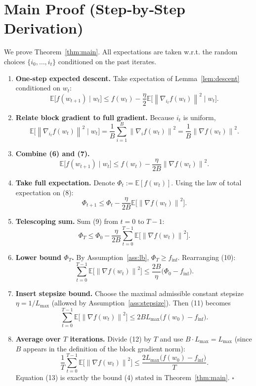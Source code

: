 \documentclass{article}
\newcommand{\E}{\mathbb{E}}
\newcommand{\norm}[1]{\left\|#1\right\|}
\newcommand{\grad}{\nabla}
\begin{document}
\section*{Main Proof (Step‑by‑Step Derivation)}
We prove Theorem~\ref{thm:main}.  All expectations are taken w.r.t. the
random choices $\{i_0,\dots ,i_{t}\}$ conditioned on the past iterates.

\begin{enumerate}[label=[Step \arabic*]]
\item \textbf{One‑step expected descent.}  
Take expectation of Lemma~\ref{lem:descent} conditioned on $w_t$:
\[
\E\!\bigl[f(w_{t+1})\mid w_t\bigr]
\le f(w_t)-\frac{\eta}{2}\E\!\bigl[\norm{\grad_{i_t}f(w_t)}^{2}\mid w_t\bigr].
\tag{6}
\]

\item \textbf{Relate block gradient to full gradient.}  
Because $i_t$ is uniform,
\[
\E\!\bigl[\norm{\grad_{i_t}f(w_t)}^{2}\mid w_t\bigr]
=\frac1B\sum_{i=1}^{B}\norm{\grad_i f(w_t)}^{2}
=\frac1B\norm{\grad f(w_t)}^{2}.
\tag{7}
\]

\item \textbf{Combine (6) and (7).}
\[
\E\!\bigl[f(w_{t+1})\mid w_t\bigr]
\le f(w_t)-\frac{\eta}{2B}\norm{\grad f(w_t)}^{2}.
\tag{8}
\]

\item \textbf{Take full expectation.}  
Denote $\Phi_t:=\E[f(w_t)]$.  Using the law of total expectation on (8):
\[
\Phi_{t+1}\le \Phi_t-\frac{\eta}{2B}\E\!\bigl[\norm{\grad f(w_t)}^{2}\bigr].
\tag{9}
\]

\item \textbf{Telescoping sum.}  
Sum (9) from $t=0$ to $T-1$:
\[
\Phi_T\le \Phi_0-\frac{\eta}{2B}\sum_{t=0}^{T-1}
\E\!\bigl[\norm{\grad f(w_t)}^{2}\bigr].
\tag{10}
\]

\item \textbf{Lower bound $\Phi_T$.}  
By Assumption~\ref{ass:lb}, $\Phi_T\ge f_{\inf}$.  Rearranging (10):
\[
\sum_{t=0}^{T-1}\E\!\bigl[\norm{\grad f(w_t)}^{2}\bigr]
\le \frac{2B}{\eta}\bigl(\Phi_0-f_{\inf}\bigr).
\tag{11}
\]

\item \textbf{Insert stepsize bound.}  
Choose the maximal admissible constant stepsize $\eta=1/L_{\max}$ (allowed by
Assumption~\ref{ass:stepsize}).  Then (11) becomes
\[
\sum_{t=0}^{T-1}\E\!\bigl[\norm{\grad f(w_t)}^{2}\bigr]
\le 2BL_{\max}\bigl(f(w_0)-f_{\inf}\bigr).
\tag{12}
\]

\item \textbf{Average over $T$ iterations.}
Divide (12) by $T$ and use $B\cdot L_{\max}=L_{\max}$ (since $B$ appears in the definition of the block gradient norm):
\[
\frac1T\sum_{t=0}^{T-1}\E\!\bigl[\norm{\grad f(w_t)}^{2}\bigr]
\le \frac{2L_{\max}\bigl(f(w_0)-f_{\inf}\bigr)}{T}.
\tag{13}
\]
Equation (13) is exactly the bound (4) stated in Theorem~\ref{thm:main}.
\hfill $\square$
\end{enumerate}
\end{document}
